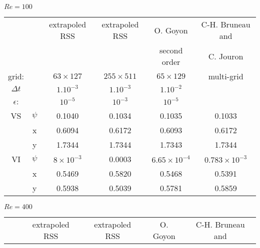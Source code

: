 \documentclass[11pt]{article}
\begin{document}
{\begin{table}[!h]
\begin{center}


$Re=100$

\begin{tabular}{| c|c|c|c|c|c | }
\hline 
                &             & extrapoled RSS     &  extrapoled RSS    & O. Goyon \cite{Goyon} & C-H. Bruneau and\\ 

                &             &                  &                  & second order               & C. Jouron \cite{BruneauJouron}  \\ 
\hline 
grid:      &             & $63 \times 127$  & $255 \times 511$ & $65 \times 129$       & multi-grid \\ 
\hline 
$\Delta t$ &        &       $1.10^{-3}$                &            $1.10^{-3}$            &        $1.10^{-2}$                           & \\
\hline 
$\epsilon$:         &             & $10^{-5}$        & $10^{-3}$        &         $10^{-5}$              &\\ 
\hline 
VS              & $\psi$      & 0.1040           & 0.1034           & 0.1035                & 0.1033\\ 

                & x           & 0.6094           & 0.6172           & 0.6093                & 0.6172\\ 

                & y           & 1.7344           & 1.7344           & 1.7343                & 1.7344\\ 
\hline 
VI              & $\psi$      & $8 \times 10^{-3}$& 0.0003           & $6.65 \times 10^{-4}$& $0.783 \times 10^{-3}$\\ 

                & x           & 0.5469          & 0.5820           & 0.5468                 & 0.5391\\ 
                
                & y           & 0.5938           & 0.5039           & 0.5781                & 0.5859\\ 
\hline
\end{tabular} 

\vspace{0.5cm}

$Re=400$

\begin{tabular}{ |  c|c|c|c|c|c | }
\hline 
                &             &  extrapoled RSS    &  extrapoled RSS    & O. Goyon \cite{Goyon} & C-H. Bruneau and\\ 


\end{tabular}
\end{center}
\end{table}}
\end{document}
